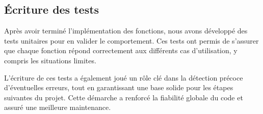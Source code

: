 \subsection{Écriture des tests}

Après avoir terminé l'implémentation des fonctions, nous avons développé des tests unitaires pour en valider le comportement. Ces tests ont permis de s’assurer que chaque fonction répond correctement aux différents cas d’utilisation, y compris les situations limites.

L’écriture de ces tests a également joué un rôle clé dans la détection précoce d’éventuelles erreurs, tout en garantissant une base solide pour les étapes suivantes du projet. Cette démarche a renforcé la fiabilité globale du code et assuré une meilleure maintenance.

